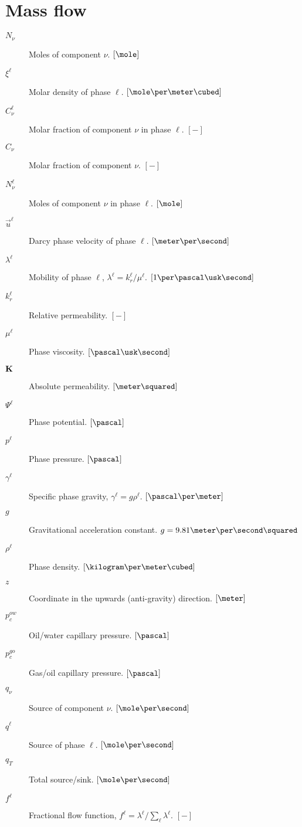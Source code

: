 
\section{Mass flow}

\begin{description}
\item[$N_\nu$] Moles of component $\nu$. $\left[\mole\right]$
\item[$\xi^\ell$] Molar density of phase $\ell$.
  $\left[\mole\per\meter\cubed\right]$
\item[$C_\nu^\ell$] Molar fraction of component $\nu$ in phase $\ell$.
  $\left[-\right]$
\item[$C_\nu$] Molar fraction of component $\nu$.  $\left[-\right]$
\item[$N_\nu^\ell$] Moles of component $\nu$ in phase $\ell$.
  $\left[\mole\right]$
\item[$\vec u^\ell$] Darcy phase velocity of phase $\ell$.
  $\left[\meter\per\second\right]$
\item[$\lambda^\ell$] Mobility of phase $\ell$,
  $\lambda^\ell=k_r^\ell/\mu^\ell$.
  $\left[1\per\pascal\usk\second\right]$
\item[$k_r^\ell$] Relative permeability. $\left[-\right]$
\item[$\mu^\ell$] Phase viscosity. $\left[\pascal\usk\second\right]$
\item[${\textbf K}$] Absolute permeability. $\left[\meter\squared\right]$
\item[$\Psi^\ell$] Phase potential. $\left[\pascal\right]$
\item[$p^\ell$] Phase pressure. $\left[\pascal\right]$
\item[$\gamma^\ell$] Specific phase gravity, $\gamma^\ell=g\rho^\ell$.
  $\left[\pascal\per\meter\right]$
\item[$g$] Gravitational acceleration constant. $g=9.81
  \meter\per\second\squared$
\item[$\rho^\ell$] Phase density.
  $\left[\kilogram\per\meter\cubed\right]$
\item[$z$] Coordinate in the upwards (anti-gravity) direction.
  $\left[\meter\right]$
\item[$p_c^{ow}$] Oil/water capillary pressure. $\left[\pascal\right]$
\item[$p_c^{go}$] Gas/oil capillary pressure. $\left[\pascal\right]$
\item[$q_\nu$] Source of component $\nu$. $\left[\mole\per\second\right]$
\item[$q^\ell$] Source of phase $\ell$. $\left[\mole\per\second\right]$
\item[$q_T$] Total source/sink. $\left[\mole\per\second\right]$
\item[$f^\ell$] Fractional flow function,
  $f^\ell=\lambda^\ell/\sum_\ell \lambda^\ell$. $\left[-\right]$
\end{description}

